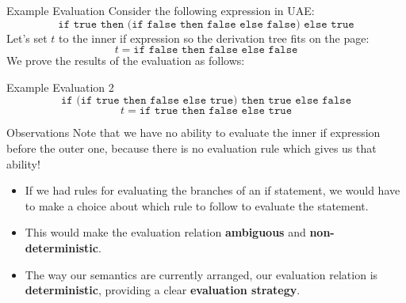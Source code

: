 \documentclass[11pt]{beamer}
\begin{document}
\begin{frame}[fragile=singleslide]{Example Evaluation}
Consider the following expression in UAE:
\begin{equation}
\texttt{if true then (if false then false else false) else true}
\end{equation}
Let's set $t$ to the inner if expression so the derivation tree fits on the page:
\begin{equation}
t = \texttt{if false then false else false}
\end{equation}
We prove the results of the evaluation as follows:
{\small
\begin{flagderiv}
\end{flagderiv}}
\end{frame}

\begin{frame}[fragile=singleslide]{Example Evaluation 2}
\begin{equation}
\texttt{if (if true then false else true) then true else false}
\end{equation}
\begin{equation}
t = \texttt{if true then false else true}
\end{equation}
\vspace{-1em}
{\small
\begin{flagderiv}
\end{flagderiv}}
\end{frame}

\begin{frame}[fragile=singleslide]{Observations}
Note that we have no ability to evaluate the inner if expression before the outer one, because there is no evaluation rule which gives us that ability! 
\begin{itemize}
\item If we had rules for evaluating the branches of an if statement, we would have to make a choice about which rule to follow to evaluate the statement.  
\item This would make the evaluation relation \textbf{ambiguous} and \textbf{non-deterministic}. 
\item The way our semantics are currently arranged, our evaluation relation is \textbf{deterministic}, providing a clear \textbf{evaluation strategy}.
\end{itemize}
\end{frame}
\end{document}
